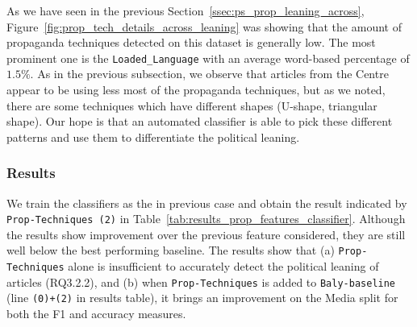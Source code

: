 
As we have seen in the previous Section~\ref{ssec:ps_prop_leaning_across},  Figure~\ref{fig:prop_tech_details_across_leaning} was showing that the amount of propaganda techniques detected on this dataset is generally low. The most prominent one is the \texttt{Loaded\_Language} with an average word-based percentage of $1.5\%$.
As in the previous subsection, we observe that articles from the Centre appear to be using less most of the propaganda techniques, %
but as we noted, there are some techniques which have different shapes (U-shape, triangular shape). Our hope is that an automated classifier is able to pick these different patterns and use them to differentiate the political leaning. 




\subsubsection{Results}

We train the classifiers as the in previous case and obtain the result indicated by \texttt{Prop-Techniques (2)} in Table~\ref{tab:results_prop_features_classifier}. Although the results show improvement over the previous feature considered, they are still well below the best performing baseline. %
The results show that (a) \texttt{Prop-Techniques} alone is insufficient to accurately detect the political leaning of articles (RQ3.2.2), and (b) when \texttt{Prop-Techniques} is added to \texttt{Baly-baseline} (line \texttt{(0)+(2)} in results table), it brings an improvement on the Media split for both the F1 and accuracy measures. 


